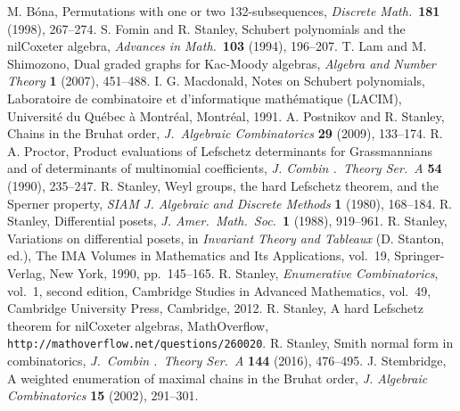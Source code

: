 \documentclass[12pt]{amsart}
\theoremstyle{definition}
\theoremstyle{remark}
\numberwithin{equation}{section}
\begin{document}
\begin{thebibliography}{9}
  M. B\'ona, Permutations with one or two
   132-subsequences, \emph{Discrete Math.}\ \textbf{181} (1998),
   267--274. 
  S. Fomin and R. Stanley, Schubert polynomials and the
  nilCoxeter algebra, \emph{Advances in Math.}\ \textbf{103} (1994),
  196--207. 
  T. Lam and M. Shimozono, Dual graded graphs for
   Kac-Moody algebras, \emph{Algebra and Number Theory} \textbf{1}
   (2007), 451--488.  
  I. G. Macdonald, Notes on Schubert polynomials,
   Laboratoire de combinatoire et d'informatique math\'ematique
   (LACIM), Universit\'e du Qu\'ebec \`a Montr\'eal, Montr\'eal,
   1991. 
  A. Postnikov and R. Stanley, Chains in the Bruhat
   order, \emph{J.\ Algebraic Combinatorics} \textbf{29} 
   (2009), 133--174.
  R. A. Proctor, Product evaluations of Lefschetz
   determinants for Grassmannians and of determinants of multinomial
   coefficients, \emph{J. Combin .\ Theory Ser.\ A} \textbf{54}
   (1990), 235--247.
  R. Stanley, Weyl groups, the hard Lefschetz theorem,
   and the Sperner property, \emph{SIAM J. Algebraic and Discrete
     Methods} \textbf{1} (1980), 168--184.
  R. Stanley, Differential posets,
   \emph{J. Amer.\ Math.\ Soc.}\ \textbf{1} (1988), 919--961.
  R. Stanley, Variations on differential posets, in
   \emph{Invariant Theory and Tableaux} (D. Stanton, ed.), The IMA
   Volumes in Mathematics and Its Applications, vol.\ 19,
   Springer-Verlag, New York, 1990, pp.\ 145--165.
  R. Stanley, \emph{Enumerative Combinatorics},
  vol.\ 1, second edition, Cambridge Studies in Advanced Mathematics,
  vol.\ 49, Cambridge University Press, Cambridge, 2012.
  R. Stanley, A hard Lefschetz theorem for
   nilCoxeter algebras, MathOverflow,
   \texttt{http://mathoverflow.net/questions/260020}.   
  R. Stanley, Smith normal form in combinatorics,
   \emph{J.\ Combin .\ Theory Ser.\ A} \textbf{144} (2016), 476--495.
  J. Stembridge, A weighted enumeration of maximal
   chains in the Bruhat order, \emph{J. Algebraic Combinatorics}
   \textbf{15} (2002), 291--301.   
\end{thebibliography}
\end{document}
